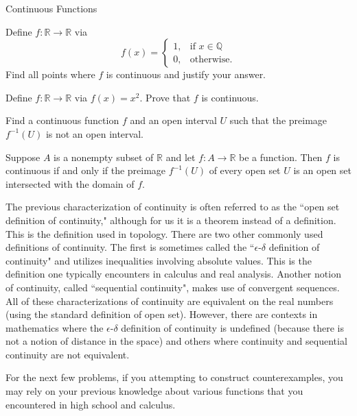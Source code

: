 \begin{section}{Continuous Functions}
\begin{problem}
Define $f:\mathbb{R}\to\mathbb{R}$ via 
\[
f(x)=\begin{cases}
1, & \text{if }x\in \mathbb{Q}\\
0, & \text{otherwise}.
\end{cases}
\]
Find all points where $f$ is continuous and justify your answer.
\end{problem}

\begin{problem}
Define $f:\mathbb{R}\to\mathbb{R}$ via $f(x)=x^2$. Prove that $f$ is continuous.
\end{problem}

\begin{problem}
Find a continuous function $f$ and an open interval $U$ such that the preimage $f^{-1}(U)$ is not an open interval.
\end{problem}

\begin{theorem}\label{thm:inverse images open sets}
Suppose $A$ is a nonempty subset of $\mathbb{R}$ and let $f:A\to \mathbb{R}$ be a function. Then $f$ is continuous if and only if the preimage $f^{-1}(U)$ of every open set $U$ is an open set intersected with the domain of $f$.
\end{theorem}

The previous characterization of continuity is often referred to as the ``open set definition of continuity," although for us it is a theorem instead of a definition. This is the definition used in topology. There are two other commonly used definitions of continuity. The first is sometimes called the ``$\epsilon$-$\delta$ definition of continuity" and utilizes inequalities involving absolute values. This is the definition one typically encounters in calculus and real analysis. Another notion of continuity, called ``sequential continuity", makes use of convergent sequences.  All of these characterizations of continuity are equivalent on the real numbers (using the standard definition of open set). However, there are contexts in mathematics where the $\epsilon$-$\delta$ definition of continuity is undefined (because there is not a notion of distance in the space) and others where continuity and sequential continuity are not equivalent.

For the next few problems, if you attempting to construct counterexamples, you may rely on your previous knowledge about various functions that you encountered in high school and calculus.


\end{section}
